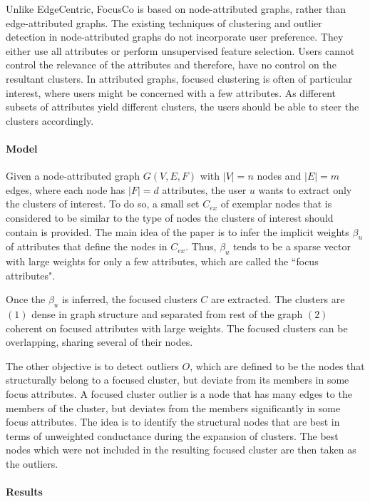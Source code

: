 \documentclass[11pt, oneside]{article}   	%
\begin{document}
\quad Unlike EdgeCentric, FocusCo \cite{focusco} is based on node-attributed graphs, rather than edge-attributed graphs.
The existing techniques of clustering and outlier detection in node-attributed graphs do not incorporate user preference.
They either use all attributes or perform unsupervised feature selection.
Users cannot control the relevance of the attributes and therefore, have no control on the resultant clusters.
In attributed graphs, focused clustering is often of particular interest, where users might be concerned with a few attributes. 
As different subsets of attributes yield different clusters, the users should be able to steer the clusters accordingly.

\paragraph{Model}
\quad

\quad Given a node-attributed graph $G(V,E,F)$ with $|V|=n$ nodes and $|E|=m$ edges, where each node has $|F| = d$ attributes, the user $u$ wants to extract only the clusters of interest.
To do so, a small set $C_{ex}$ of exemplar nodes that is considered to be similar to the type of nodes the clusters of interest should contain is provided.
The main idea of the paper is to infer the implicit weights $\beta_{u}$ of attributes that define the nodes in $C_{ex}$.
Thus, $\beta_u$ tends to be a sparse vector with large weights for only a few attributes, which are called the ``focus attributes".

\quad Once the $\beta_u$ is inferred, the focused clusters $C$ are extracted. 
The clusters are $(1)$ dense in graph structure and separated from rest of the graph $(2)$ coherent on focused attributes with large weights.
The focused clusters can be overlapping, sharing several of their nodes.

\quad The other objective is to detect outliers $O$, which are defined to be the nodes that structurally belong to a focused cluster, but deviate from its members in some focus attributes. A focused cluster outlier is a node that has many edges to the members of the cluster, but deviates from the members significantly in some focus attributes.
The idea is to identify the structural nodes that are best in terms of unweighted conductance during the expansion of clusters.
The best nodes which were not included in the resulting focused cluster are then taken as the outliers.


\paragraph{Results}
\quad
\end{document}
